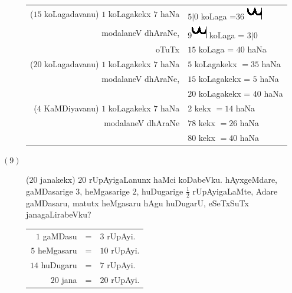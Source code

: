 \begin{description}
    \begin{tabular}{rl}
    ($15$ koLagadavanu) $1$ koLagakekx $7$ haNa & $5|$0 koLaga
    =$36$ \includegraphics{images/mu.eps} \\
    modalaneV dhAraNe, & $9$\includegraphics{images/mu.eps} 
    koLaga =  $3|$0\\
    \cline{2-2}
    oTuTx & $15$ koLaga = $40$ haNa\\
    \cline{2-2}
    ($20$ koLagadavanu) $1$ koLagakekx $7$ haNa & $5$ koLagakekx $=
    35$ haNa\\
    modalaneV dhAraNe, & $15$ koLagakekx = $5$ haNa\\
    \cline{2-2}
    & $20$ koLagakekx = $40$ haNa\\
    \cline{2-2}
    ($4$ KaMDiyavanu) $1$ koLagakekx $7$ haNa & $2$ kekx $= 14$ haNa\\
    modalaneV dhAraNe & $78$ kekx $=26$ haNa\\
    \cline{2-2}
    & $80$ kekx $= 40$ haNa\\
    \cline{2-2}
    \end{tabular}

\item[$(9)$] ($20$ janakekx) $20$ rUpAyigaLanunx haMci
    koDabeVku. hAyxgeMdare, gaMDasarige $3$, heMgasarige $2$, huDugarige
    $\frac{1}{2}$ rUpAyigaLaMte, Adare gaMDasaru, matutx heMgasaru
    hAgu huDugarU, eSeTxSuTx janagaLirabeVku?

    \begin{tabular}{rcl}
        $1$ gaMDasu & = &$3$ rUpAyi.\\
        $5$ heMgasaru & = &$10$ rUpAyi.\\
        $14$ huDugaru & = &$7$ rUpAyi.\\
        \hline
        $20$ jana & = &$20$ rUpAyi.\\
        \hline
    \end{tabular}
\end{description}
